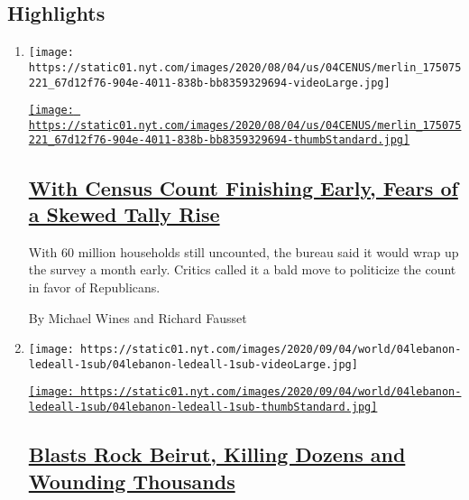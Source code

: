 \hypertarget{highlights}{%
\subsection{Highlights}\label{highlights}}

\begin{enumerate}
\def\labelenumi{\arabic{enumi}.}
\item
  \texttt{[image: https://static01.nyt.com/images/2020/08/04/us/04CENUS/merlin\_175075221\_67d12f76-904e-4011-838b-bb8359329694-videoLarge.jpg]}

  \href{/2020/08/04/us/2020-census-ending-early.html}{\texttt{[image: https://static01.nyt.com/images/2020/08/04/us/04CENUS/merlin\_175075221\_67d12f76-904e-4011-838b-bb8359329694-thumbStandard.jpg]}}

  \hypertarget{with-census-count-finishing-early-fears-of-a-skewed-tally-rise}{%
  \subsection{\texorpdfstring{\href{/2020/08/04/us/2020-census-ending-early.html}{With
  Census Count Finishing Early, Fears of a Skewed Tally
  Rise}}{With Census Count Finishing Early, Fears of a Skewed Tally Rise}}\label{with-census-count-finishing-early-fears-of-a-skewed-tally-rise}}

  With 60 million households still uncounted, the bureau said it would
  wrap up the survey a month early. Critics called it a bald move to
  politicize the count in favor of Republicans.

  By Michael Wines and Richard Fausset
\item
  \texttt{[image: https://static01.nyt.com/images/2020/09/04/world/04lebanon-ledeall-1sub/04lebanon-ledeall-1sub-videoLarge.jpg]}

  \href{/2020/08/04/world/middleeast/lebanon-explosion.html}{\texttt{[image: https://static01.nyt.com/images/2020/09/04/world/04lebanon-ledeall-1sub/04lebanon-ledeall-1sub-thumbStandard.jpg]}}

  \hypertarget{blasts-rock-beirut-killing-dozens-and-wounding-thousands}{%
  \subsection{\texorpdfstring{\href{/2020/08/04/world/middleeast/lebanon-explosion.html}{Blasts
  Rock Beirut, Killing Dozens and Wounding
  Thousands}}{Blasts Rock Beirut, Killing Dozens and Wounding Thousands}}\label{blasts-rock-beirut-killing-dozens-and-wounding-thousands}}


\end{enumerate}
